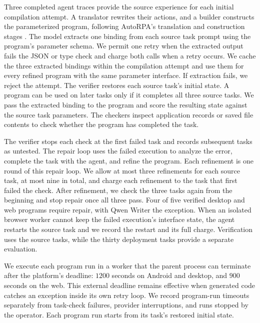 Three completed agent traces provide the source experience for each initial compilation attempt.
A translator rewrites their actions, and a builder constructs the parameterized program, following AutoRPA's translation and construction stages \citep{chen2026autorpa}.
The model extracts one binding from each source task prompt using the program's parameter schema.
We permit one retry when the extracted output fails the JSON or type check and charge both calls when a retry occurs.
We cache the three extracted bindings within the compilation attempt and use them for every refined program with the same parameter interface.
If extraction fails, we reject the attempt.
The verifier restores each source task's initial state.
A program can be used on later tasks only if it completes all three source tasks.
We pass the extracted binding to the program and score the resulting state against the source task parameters.
The checkers inspect application records or saved file contents to check whether the program has completed the task.

The verifier stops each check at the first failed task and records subsequent tasks as untested.
The repair loop uses the failed execution to analyze the error, complete the task with the agent, and refine the program.
Each refinement is one round of this repair loop.
We allow at most three refinements for each source task, at most nine in total, and charge each refinement to the task that first failed the check.
After refinement, we check the three tasks again from the beginning and stop repair once all three pass.
Four of five verified desktop and web programs require repair, with Qwen Writer the exception.
When an isolated browser worker cannot keep the failed execution's interface state, the agent restarts the source task and we record the restart and its full charge.
Verification uses the source tasks, while the thirty deployment tasks provide a separate evaluation.

We execute each program run in a worker that the parent process can terminate after the platform's deadline: $1200$ seconds on Android and desktop, and $900$ seconds on the web.
This external deadline remains effective when generated code catches an exception inside its own retry loop.
We record program-run timeouts separately from task-check failures, provider interruptions, and runs stopped by the operator.
Each program run starts from its task's restored initial state.


